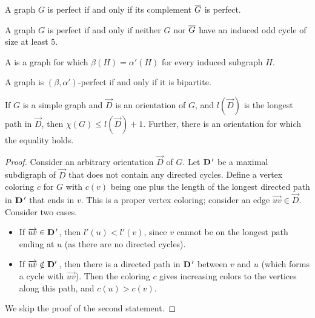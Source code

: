 
\begin{theorem}
  A graph $G$ is perfect if and only if its complement $\overline{G}$ is perfect.
\end{theorem}

\begin{theorem}
  A graph $G$ is perfect if and only if neither $G$ nor $\overline{G}$ have an induced
  odd cycle of size at least $5$.
\end{theorem}


\begin{definition}
  A  is a graph for which $\beta(H) =
  \alpha'(H)$ for every induced subgraph $H$.
\end{definition}

\begin{theorem}
  A graph is $(\beta, \alpha')$-perfect if and only if it is bipartite.
\end{theorem}


\begin{theorem}
  If $G$ is a simple graph and $\vec{D}$ is an orientation of $G$, and
  $l(\vec{D})$ is the longest path in $\vec{D}$, then $\chi(G) \le l(\vec{D}) +
  1$.
  Further, there is an orientation for which the equality holds.
\end{theorem}

\begin{proof}
  Consider an arbitrary orientation $\vec{D}$ of $G$.
  Let $\pvec{D}'$ be a maximal subdigraph of $\vec{D}$ that does not contain any
  directed cycles.
  Define a vertex coloring $c$ for $G$ with $c(v)$ being one plus the length of
  the longest directed path in $\pvec{D}'$ that ends in $v$.
  This is a proper vertex coloring; consider an edge $\overrightarrow{uv} \in
  \vec{D}$.
  Consider two cases.
  \begin{itemize}
  \item If $\overrightarrow{uv} \in \pvec{D}'$, then $l'(u) < l'(v)$, since $v$
	cannot be on the longest path ending at $u$ (as there are no directed cycles).
  \item If $\overrightarrow{uv} \notin \pvec{D'}$, then there is a directed path
	in $\pvec{D}'$ between $v$ and $u$ (which forms a cycle with
	$\overrightarrow{uv}$).
	Then the coloring $c$ gives increasing colors to the vertices along this
	path, and $c(u) > c(v)$.
  \end{itemize}
  We skip the proof of the second statement.
\end{proof}


